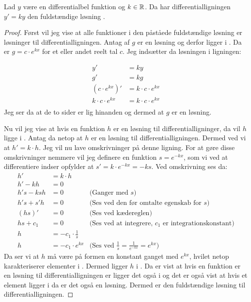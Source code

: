\begin{thm}\label{thm:y'=k*y}
Lad $y$ være en differentialbel funktion og $k\in \mathbb{R}$. Da har  differentialligningen $y' = ky$ den fuldstændige løsning \LosEks.
\end{thm}
\begin{proof}
Først vil jeg vise at alle funktioner i den påståede fuldstændige løsning er løsninger til differentialligningen.
Antag af $g$ er en løsning og derfor ligger i \LosEks .
Da er $g=c\cdot e^{kx}$ for et eller andet reelt tal $c$.
Jeg indsætter da løsningen i ligningen: 

\begin{align*}
y' &= ky\\
g' &= kg\\
(c\cdot e^{kx})' &= k\cdot c\cdot e^{kx}\\
k\cdot c\cdot e^{kx} &= k\cdot c\cdot e^{kx}\\
\end{align*}
Jeg ser da at de to sider er lig hinanden og dermed at $g$ er en løsning. 

Nu vil jeg vise at hvis en funktion $h$ er en løsning til differentialligninger, da vil $h$ ligge i \LosEks.
Antag da netop at $h$ er en løsning til differentialligningen. 
Dermed ved vi at $h'=k\cdot h$.
Jeg vil nu lave omskrivninger på denne ligning. 
For at gøre disse omskrivninger nemmere vil jeg definere en funktion $s=e^{-kx}$, som vi ved at differentiere indser opfylder at $s'=k \cdot e^{-kx} = -ks$.
Ved omskrivning ses da:
\begin{align*}
h'&=k\cdot h \\
h'-kh &= 0\\
h's-ksh&=0 		& \text{(Ganger med }s\text{)}\\
h's+s'h&=0		& \text{(Ses ved den før omtalte egenskab for $s$)}\\
(hs)'&=0		&\text{(Ses ved kædereglen)}\\
hs+c_1 &= 0		&\text{(Ses ved at integrere, $c_1$ er integrationskonstant)}\\
h&= -c_1 \cdot \frac{1}{s}\\
h&= -c_1 \cdot e^{kx} &\text{(Ses ved $\frac{1}{s}=\frac{1}{e^{-kx}} = e^{kx}$)}
\end{align*}
Da ser vi at $h$ må være på formen en konstant ganget med $e^{kx}$, hvilet netop karakteriserer elementer i \LosEks. 
Dermed ligger $h$ i \LosEks.
Da er vist at hvis en funktion er en løsning til differentialligningen er ligger det også i \LosEks og det er også vist at hvis et element ligger i \LosEks da er det også en løsning. 
Dermed er \LosEks den fuldstændige løsning til differentialligningen. 
\end{proof}